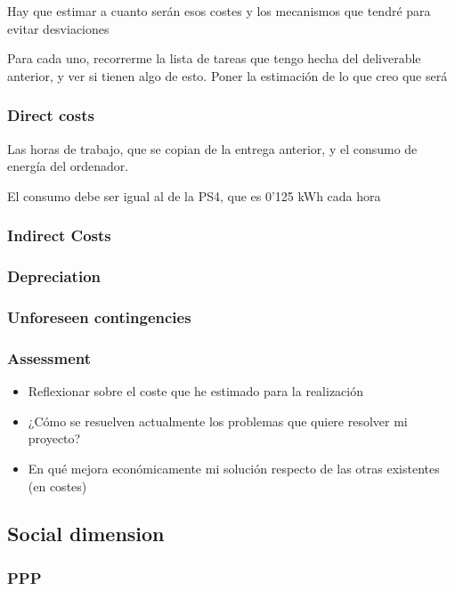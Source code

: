 \documentclass[a4paper]{article}
\begin{document}
            Hay que estimar a cuanto serán esos costes y los mecanismos que tendré para evitar desviaciones


            Para cada uno, recorrerme la lista de tareas que tengo hecha del deliverable anterior, y ver si tienen algo de esto. Poner la estimación de lo que creo que será

            \subsubsection*{Direct costs}
            Las horas de trabajo, que se copian de la entrega anterior, y el consumo de energía del ordenador.

            El consumo debe ser igual al de la PS4, que es 0’125 kWh cada hora

            \subsubsection*{Indirect Costs}
            \subsubsection*{Depreciation}
            \subsubsection*{Unforeseen contingencies}

            \subsubsection{Assessment}

            \begin{itemize}
                \item Reflexionar sobre el coste que he estimado para la realización
                \item ¿Cómo se resuelven actualmente los problemas que quiere resolver mi proyecto?
                \item En qué mejora económicamente mi solución respecto de las otras existentes (en costes)
            \end{itemize}



        \subsection{Social dimension}
            \subsubsection{PPP}
\end{document}
